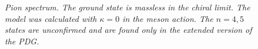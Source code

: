 \begin{figure}[htb]
\caption{\textit{Pion spectrum. The ground state is massless in the chiral limit. The model was calculated with $\kappa=0$ in the meson action. The $n=4,5$ states are unconfirmed and are found only in the extended version of the PDG.}}
\end{figure}



